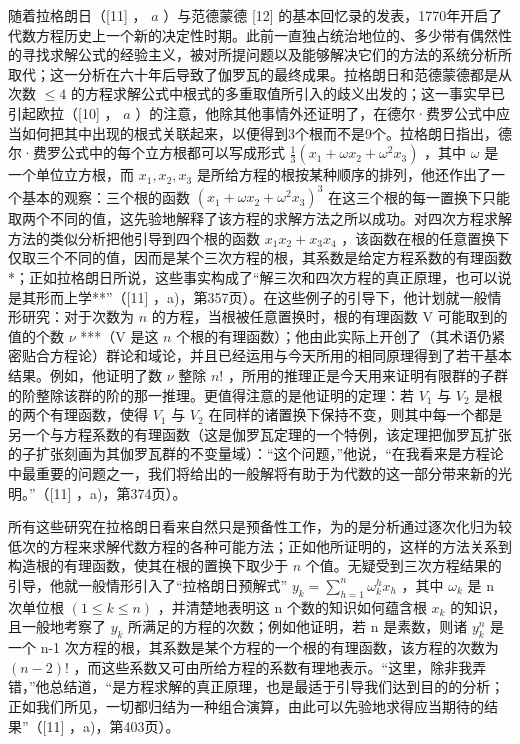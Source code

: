 随着拉格朗日（{[}11{]} ， \(a\) ）与范德蒙德 {[}12{]} 的基本回忆录的发表，1770年开启了代数方程历史上一个新的决定性时期。此前一直独占统治地位的、多少带有偶然性的寻找求解公式的经验主义，被对所提问题以及能够解决它们的方法的系统分析所取代；这一分析在六十年后导致了伽罗瓦的最终成果。拉格朗日和范德蒙德都是从次数 \(\leqslant 4\) 的方程求解公式中根式的多重取值所引入的歧义出发的；这一事实早已引起欧拉（{[}10{]} ， \(a\) ）的注意，他除其他事情外还证明了，在德尔·费罗公式中应当如何把其中出现的根式关联起来，以便得到3个根而不是9个。拉格朗日指出，德尔·费罗公式中的每个立方根都可以写成形式 \(\frac{1}{3} (x_1 + \omega x_2 + \omega^2 x_3)\) ，其中 \(\omega\) 是一个单位立方根，而 \(x_1, x_2, x_3\) 是所给方程的根按某种顺序的排列，他还作出了一个基本的观察：三个根的函数 \((x_1 + \omega x_2 + \omega^2 x_3)^3\) 在这三个根的每一置换下只能取两个不同的值，这先验地解释了该方程的求解方法之所以成功。对四次方程求解方法的类似分析把他引导到四个根的函数 \(x_1 x_2 + x_3 x_4\) ，该函数在根的任意置换下仅取三个不同的值，因而是某个三次方程的根，其系数是给定方程系数的有理函数*；正如拉格朗日所说，这些事实构成了“解三次和四次方程的真正原理，也可以说是其形而上学**”（{[}11{]} ，a)，第357页）。在这些例子的引导下，他计划就一般情形研究：对于次数为 \(n\) 的方程，当根被任意置换时，根的有理函数 V 可能取到的值的个数 \(\nu\) ***（V 是这 \(n\) 个根的有理函数）；他由此实际上开创了（其术语仍紧密贴合方程论）群论和域论，并且已经运用与今天所用的相同原理得到了若干基本结果。例如，他证明了数 \(\nu\) 整除 \(n!\) ，所用的推理正是今天用来证明有限群的子群的阶整除该群的阶的那一推理。更值得注意的是他证明的定理：若 \(V_1\) 与 \(V_2\) 是根的两个有理函数，使得 \(V_1\) 与 \(V_2\) 在同样的诸置换下保持不变，则其中每一个都是另一个与方程系数的有理函数（这是伽罗瓦定理的一个特例，该定理把伽罗瓦扩张的子扩张刻画为其伽罗瓦群的不变量域）：“这个问题，”他说，“在我看来是方程论中最重要的问题之一，我们将给出的一般解将有助于为代数的这一部分带来新的光明。”（{[}11{]} ，a)，第374页）。

所有这些研究在拉格朗日看来自然只是预备性工作，为的是分析通过逐次化归为较低次的方程来求解代数方程的各种可能方法；正如他所证明的，这样的方法关系到构造根的有理函数，使其在根的置换下取少于 \(n\) 个值。无疑受到三次方程结果的引导，他就一般情形引入了“拉格朗日预解式” \(y_{k} = \sum_{h=1}^{n} \omega_{k}^{h} x_{h}\) ，其中 \(\omega_{k}\) 是 n 次单位根 \((1 \leqslant k \leqslant n)\) ，并清楚地表明这 n 个数的知识如何蕴含根 \(x_{k}\) 的知识，且一般地考察了 \(y_{k}\) 所满足的方程的次数；例如他证明，若 n 是素数，则诸 \(y_{k}^{n}\) 是一个 n-1 次方程的根，其系数是某个方程的一个根的有理函数，该方程的次数为 \((n-2)!\) ，而这些系数又可由所给方程的系数有理地表示。“这里，除非我弄错，”他总结道，“是方程求解的真正原理，也是最适于引导我们达到目的的分析；正如我们所见，一切都归结为一种组合演算，由此可以先验地求得应当期待的结果”（{[}11{]} ，a)，第403页）。

